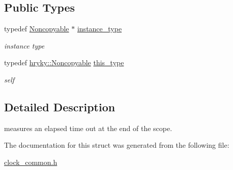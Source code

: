 \subsection*{Public Types}
\begin{DoxyCompactItemize}
\item 
\hypertarget{classhryky_1_1_noncopyable_aaf87abb55f700af85ecb0895f6178821}{typedef \hyperlink{classhryky_1_1_noncopyable}{Noncopyable} $\ast$ \hyperlink{classhryky_1_1_noncopyable_aaf87abb55f700af85ecb0895f6178821}{instance\-\_\-type}}\label{classhryky_1_1_noncopyable_aaf87abb55f700af85ecb0895f6178821}

\begin{DoxyCompactList}\small\item\em instance type \end{DoxyCompactList}\item 
\hypertarget{classhryky_1_1_noncopyable_acf13ad1c98a76247a561dff514979da5}{typedef \hyperlink{classhryky_1_1_noncopyable}{hryky\-::\-Noncopyable} \hyperlink{classhryky_1_1_noncopyable_acf13ad1c98a76247a561dff514979da5}{this\-\_\-type}}\label{classhryky_1_1_noncopyable_acf13ad1c98a76247a561dff514979da5}

\begin{DoxyCompactList}\small\item\em self \end{DoxyCompactList}\end{DoxyCompactItemize}


\subsection{Detailed Description}
measures an elapsed time out at the end of the scope. 

The documentation for this struct was generated from the following file\-:\begin{DoxyCompactItemize}
\item 
\hyperlink{clock__common_8h}{clock\-\_\-common.\-h}\end{DoxyCompactItemize}

